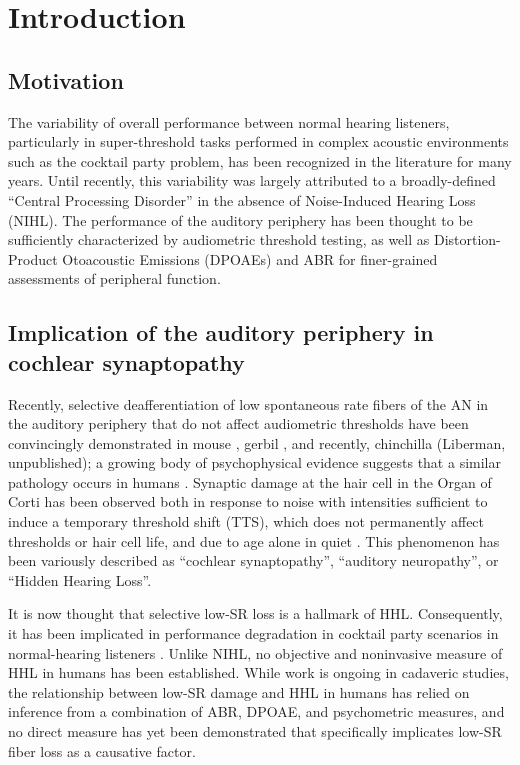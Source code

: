 \chapter{Introduction}
\label{chapter:Introduction}
\thispagestyle{myheadings}
\section{Motivation}
The variability of overall performance between normal hearing listeners, particularly in super-threshold tasks performed in complex acoustic environments such as the cocktail party problem, has been recognized in the literature for many years.  Until recently, this variability was largely attributed to a broadly-defined ``Central Processing Disorder'' in the absence of Noise-Induced Hearing Loss (NIHL). The performance of the auditory periphery has been thought to be sufficiently characterized by audiometric threshold testing, as well as Distortion-Product Otoacoustic Emissions (DPOAEs) and ABR for finer-grained assessments of peripheral function.

\section{Implication of the auditory periphery in cochlear synaptopathy}
Recently, selective deafferentiation of low spontaneous rate fibers of the AN in the auditory periphery that do not affect audiometric thresholds have been convincingly demonstrated in mouse \citep{Kujawa2009Adding}, gerbil \citep{Furman2013NoiseInduced}, and recently, chinchilla (Liberman, unpublished); a growing body of psychophysical evidence suggests that a similar pathology occurs in humans \citep{Bharadwaj2015Individual}.  Synaptic damage at the hair cell in the Organ of Corti has been observed both in response to noise with intensities sufficient to induce a temporary threshold shift (TTS), which does not permanently affect thresholds or hair cell life, and due to age alone in quiet \citep{Sergeyenko2013AgeRelated,Fernandez2015Aging}. This phenomenon has been variously described as ``cochlear synaptopathy''\citep{Bharadwaj2014Cochlear}, ``auditory neuropathy'', or ``Hidden Hearing Loss''.  

It is now thought that selective low-SR loss is a hallmark of HHL. Consequently, it has been implicated in performance degradation in cocktail party scenarios in normal-hearing listeners \citep{Bharadwaj2015Individual,Bharadwaj2014Cochlear}.  Unlike NIHL, no objective and noninvasive measure of HHL in humans has been established.  While work is ongoing in cadaveric studies, the relationship between low-SR damage and HHL in humans has relied on inference from a combination of ABR, DPOAE, and psychometric measures, and no direct measure has yet been demonstrated that specifically implicates low-SR fiber loss as a causative factor.

